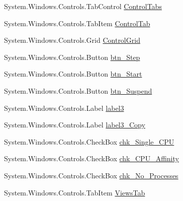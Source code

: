 \begin{DoxyCompactItemize}
\item 
System.\+Windows.\+Controls.\+Tab\+Control \hyperlink{class_c_p_u___o_s___simulator_1_1_operating_system_main_window_aad49944b6a55d895806ca01be83440e7}{Control\+Tabs}
\item 
System.\+Windows.\+Controls.\+Tab\+Item \hyperlink{class_c_p_u___o_s___simulator_1_1_operating_system_main_window_a06541ab6c749adc4696fe5ec1f174fcf}{Control\+Tab}
\item 
System.\+Windows.\+Controls.\+Grid \hyperlink{class_c_p_u___o_s___simulator_1_1_operating_system_main_window_a8214613c45a89010009e4c3cca7e36f3}{Control\+Grid}
\item 
System.\+Windows.\+Controls.\+Button \hyperlink{class_c_p_u___o_s___simulator_1_1_operating_system_main_window_aa7fab2cb43aa4eefed8e3bcba47a539b}{btn\+\_\+\+Step}
\item 
System.\+Windows.\+Controls.\+Button \hyperlink{class_c_p_u___o_s___simulator_1_1_operating_system_main_window_a811cecc7b1fa49c7f340be7377ff7f32}{btn\+\_\+\+Start}
\item 
System.\+Windows.\+Controls.\+Button \hyperlink{class_c_p_u___o_s___simulator_1_1_operating_system_main_window_abb2c3824f2ed103814e81c8a6bf5452e}{btn\+\_\+\+Suspend}
\item 
System.\+Windows.\+Controls.\+Label \hyperlink{class_c_p_u___o_s___simulator_1_1_operating_system_main_window_a731180865f00c29a9d6affd3ba2860c1}{label3}
\item 
System.\+Windows.\+Controls.\+Label \hyperlink{class_c_p_u___o_s___simulator_1_1_operating_system_main_window_ab76c53e23eb4219d850c3b7a85bf1dd7}{label3\+\_\+\+Copy}
\item 
System.\+Windows.\+Controls.\+Check\+Box \hyperlink{class_c_p_u___o_s___simulator_1_1_operating_system_main_window_a7d57ae7ba4ca24e126fabf4d124f7812}{chk\+\_\+\+Single\+\_\+\+C\+P\+U}
\item 
System.\+Windows.\+Controls.\+Check\+Box \hyperlink{class_c_p_u___o_s___simulator_1_1_operating_system_main_window_a5f027a391759480d1d00c76c2171c6b9}{chk\+\_\+\+C\+P\+U\+\_\+\+Affinity}
\item 
System.\+Windows.\+Controls.\+Check\+Box \hyperlink{class_c_p_u___o_s___simulator_1_1_operating_system_main_window_a61ea8b3bc04203f4a4caa33f21089d18}{chk\+\_\+\+No\+\_\+\+Processes}
\item 
System.\+Windows.\+Controls.\+Tab\+Item \hyperlink{class_c_p_u___o_s___simulator_1_1_operating_system_main_window_a212223330899dc87b6dd0b1dd9fbbfd0}{Views\+Tab}
\item 

\end{DoxyCompactItemize}
